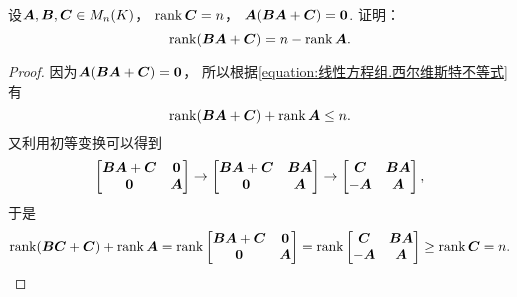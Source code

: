 \begin{example}
设\(\boldsymbol{A},\boldsymbol{B},\boldsymbol{C} \in M_n(K)\)，
\(\rank\boldsymbol{C}=n\)，
\(\boldsymbol{A}(\boldsymbol{B}\boldsymbol{A}+\boldsymbol{C})=\boldsymbol0\).
证明：\begin{equation*}
	\rank(\boldsymbol{B}\boldsymbol{A}+\boldsymbol{C})=n-\rank\boldsymbol{A}.
\end{equation*}
\begin{proof}
因为\(\boldsymbol{A}(\boldsymbol{B}\boldsymbol{A}+\boldsymbol{C})=\boldsymbol0\)，
所以根据\cref{equation:线性方程组.西尔维斯特不等式} 有\begin{equation*}
	\rank(\boldsymbol{B}\boldsymbol{A}+\boldsymbol{C})+\rank\boldsymbol{A} \leq n.
\end{equation*}
又利用初等变换可以得到\begin{equation*}
	\begin{bmatrix}
		\boldsymbol{B}\boldsymbol{A}+\boldsymbol{C} & \boldsymbol0 \\
		\boldsymbol0 & \boldsymbol{A}
	\end{bmatrix}
	\to \begin{bmatrix}
		\boldsymbol{B}\boldsymbol{A}+\boldsymbol{C} & \boldsymbol{B}\boldsymbol{A} \\
		\boldsymbol0 & \boldsymbol{A}
	\end{bmatrix}
	\to \begin{bmatrix}
		\boldsymbol{C} & \boldsymbol{B}\boldsymbol{A} \\
		-\boldsymbol{A} & \boldsymbol{A}
	\end{bmatrix},
\end{equation*}
于是\begin{equation*}
	\rank(\boldsymbol{B}\boldsymbol{C}+\boldsymbol{C})
	+\rank\boldsymbol{A}
	= \rank\begin{bmatrix}
		\boldsymbol{B}\boldsymbol{A}+\boldsymbol{C} & \boldsymbol0 \\
		\boldsymbol0 & \boldsymbol{A}
	\end{bmatrix}
	= \rank\begin{bmatrix}
		\boldsymbol{C} & \boldsymbol{B}\boldsymbol{A} \\
		-\boldsymbol{A} & \boldsymbol{A}
	\end{bmatrix}
	\geq \rank\boldsymbol{C} = n.
	\qedhere
\end{equation*}
\end{proof}
\end{example}

